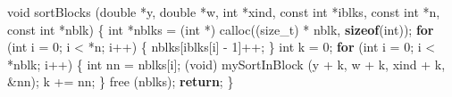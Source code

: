 \documentclass[
  12pt,
]{book}
\newenvironment{Shaded}{\begin{snugshade}}{\end{snugshade}}
\newcommand{\ControlFlowTok}[1]{\textcolor[rgb]{0.13,0.29,0.53}{\textbf{#1}}}
\newcommand{\DataTypeTok}[1]{\textcolor[rgb]{0.13,0.29,0.53}{#1}}
\newcommand{\DecValTok}[1]{\textcolor[rgb]{0.00,0.00,0.81}{#1}}
\newcommand{\KeywordTok}[1]{\textcolor[rgb]{0.13,0.29,0.53}{\textbf{#1}}}
\newcommand{\NormalTok}[1]{#1}
\theoremstyle{definition}
\theoremstyle{definition}
\theoremstyle{definition}
\theoremstyle{definition}
\theoremstyle{remark}
\begin{document}
\begin{Shaded}
\begin{Highlighting}[]
\DataTypeTok{void}\NormalTok{ sortBlocks (}\DataTypeTok{double}\NormalTok{ *y, }\DataTypeTok{double}\NormalTok{ *w, }\DataTypeTok{int}\NormalTok{ *xind, }\DataTypeTok{const} \DataTypeTok{int}\NormalTok{ *iblks, }\DataTypeTok{const} \DataTypeTok{int}\NormalTok{ *n, }\DataTypeTok{const} \DataTypeTok{int}\NormalTok{ *nblk) \{}
    \DataTypeTok{int}\NormalTok{ *nblks = (}\DataTypeTok{int}\NormalTok{ *) calloc((}\DataTypeTok{size\_t}\NormalTok{) * nblk, }\KeywordTok{sizeof}\NormalTok{(}\DataTypeTok{int}\NormalTok{));}
    \ControlFlowTok{for}\NormalTok{ (}\DataTypeTok{int}\NormalTok{ i = }\DecValTok{0}\NormalTok{; i \textless{} *n; i++) \{}
\NormalTok{        nblks[iblks[i] {-} }\DecValTok{1}\NormalTok{]++;}
\NormalTok{    \}}
    \DataTypeTok{int}\NormalTok{ k = }\DecValTok{0}\NormalTok{;}
    \ControlFlowTok{for}\NormalTok{ (}\DataTypeTok{int}\NormalTok{ i = }\DecValTok{0}\NormalTok{; i \textless{} *nblk; i++) \{}
        \DataTypeTok{int}\NormalTok{ nn = nblks[i];}
\NormalTok{        (}\DataTypeTok{void}\NormalTok{) mySortInBlock (y + k, w + k, xind + k, \&nn);}
\NormalTok{        k += nn;}
\NormalTok{    \}}
\NormalTok{    free (nblks);}
    \ControlFlowTok{return}\NormalTok{;}
\NormalTok{\}}


\end{Highlighting}
\end{Shaded}
\end{document}
